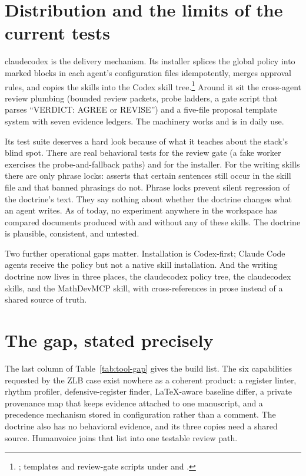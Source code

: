 \section{Distribution and the limits of the current tests}
\label{sec:tool-claudecodex}

claudecodex is the delivery mechanism. Its installer splices the global
policy into marked blocks in each agent's configuration files idempotently,
merges approval rules, and copies the skills into the Codex skill
tree.\footnote{; templates and review-gate scripts under  and .}
Around it sit the cross-agent review plumbing (bounded review packets, probe
ladders, a gate script that parses ``VERDICT: AGREE or REVISE'') and a
five-file proposal template system with seven evidence ledgers. The
machinery works and is in daily use.

Its test suite deserves a hard look because of what it teaches about the
stack's blind spot. There are real behavioral tests for the review gate (a
fake worker exercises the probe-and-fallback paths) and for the installer.
For the writing skills there are only phrase locks:
 asserts that certain sentences
still occur in the skill file and that banned phrasings do not. Phrase locks
prevent silent regression of the doctrine's text. They say nothing about
whether the doctrine changes what an agent writes. As of today, no experiment
anywhere in the workspace has compared documents produced with and without
any of these skills. The doctrine is plausible, consistent, and untested.

Two further operational gaps matter. Installation is
Codex-first; Claude Code agents receive the policy but not a native skill
installation. And the writing doctrine now lives in three places, the
claudecodex policy tree, the claudecodex skills, and the MathDevMCP skill,
with cross-references in prose instead of a shared source of truth.

\section{The gap, stated precisely}
\label{sec:tool-gap}

The last column of Table~\ref{tab:tool-gap} gives the build list. The six
capabilities requested by the ZLB case exist nowhere as a coherent product: a
register linter, rhythm profiler, defensive-register finder, LaTeX-aware
baseline differ, a private provenance map that keeps evidence attached to one
manuscript, and a precedence mechanism stored in configuration rather than a
comment. The doctrine also has no behavioral evidence, and its three copies
need a shared source. Humanvoice joins that list into one testable review path.

